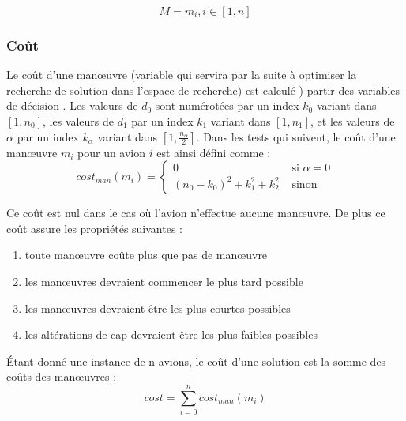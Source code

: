 \begin{equation}
M = {m_{i},i\in [1,n]}
\end{equation}

\subsubsection*{Coût}

Le coût d'une manœuvre (variable qui servira par la suite à optimiser la recherche de solution dans l'espace de recherche) est calculé ) partir des variables de décision . Les valeurs de $d_{0}$ sont numérotées par un index $k_{0}$ variant dans $[1,n_{0}]$, les valeurs de $d_{1}$ par un index $k_{1}$ variant dans $[1,n_{1}]$, et les valeurs de $\alpha$ par un index $k_{\alpha}$ variant dans $[1,\frac{n_{\alpha}}{2}]$. Dans les tests qui suivent, le coût d'une manœuvre $m_{i}$ pour un avion $i$ est ainsi défini comme : \\


\begin{equation}
cost_{man}(m_{i}) = \begin{cases}
 0 &\text{ si }\alpha=0\\
 
 (n_{0}-k_{0})^{2}+k_{1}^{2}+k_{2}^2 &\text{ sinon }

\end{cases}
\end{equation}

Ce coût est nul dans le cas où l'avion n'effectue aucune manœuvre. De plus ce coût assure les propriétés suivantes : 

\begin{enumerate}
\item toute manœuvre coûte plus que pas de manœuvre
\item les manœuvres devraient commencer le plus tard possible
\item les manœuvres devraient être les plus courtes possibles
\item les altérations de cap devraient être les plus faibles possibles \\
\end{enumerate}

Étant donné une instance de n avions, le coût d'une solution est la somme des coûts des manœuvres : \\

\begin{equation}
cost = \sum_{i=0}^{n}cost_{man}(m_{i})
\end{equation}

